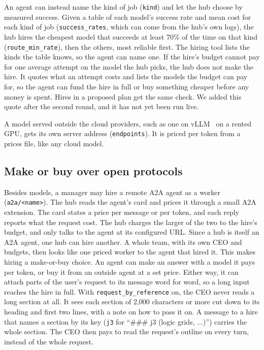 An agent can instead name the kind of job (\texttt{kind}) and let the hub choose by measured success. Given a table of
each model's success rate and mean cost for each kind of job (\texttt{success\_rates}, which can come from the hub's
own logs), the hub hires the cheapest model that succeeds at least 70\% of the time on that kind
(\texttt{route\_min\_rate}), then the others, most reliable first. The hiring tool lists the kinds the table knows, so
the agent can name one. If the hire's budget cannot pay for one average attempt on the model the hub picks, the hub does
not make the hire. It quotes what an attempt costs and lists the models the budget can pay for, so the agent can fund
the hire in full or buy something cheaper before any money is spent. Hires in a proposed plan get the same check. We
added this quote after the second round, and it has not yet been run live.

A model served outside the cloud providers, such as one on vLLM~\cite{kwon2023vllm} on a rented GPU, gets its own
server address (\texttt{endpoints}). It is priced per token from a prices file, like any cloud model.

\subsection{Make or buy over open protocols}
Besides models, a manager may hire a remote A2A agent as a worker (\texttt{a2a/<name>}). The hub reads the agent's
card and prices it through a small A2A extension. The card states a price per message or per token, and each reply
reports what the request cost. The hub charges the larger of the two to the hire's budget, and only talks to the agent
at its configured URL. Since a \sys{} hub is itself an A2A agent, one hub can hire another. A whole team, with its own
CEO and budgets, then looks like one priced worker to the agent that hired it. This makes hiring a make-or-buy choice.
An agent can make an answer with a model it pays per token, or buy it from an outside agent at a set price. Either way,
it can attach parts of the user's request to its message word for word, so a long input reaches the hire in full. With
\texttt{request\_by\_reference} on, the CEO never reads a long section at all. It sees each section of 2,000
characters or more cut down to its heading and first two lines, with a note on how to pass it on. A message to a hire
that names a section by its key (\texttt{j3} for ``\#\#\# j3 (logic grids, ...)'') carries the whole section. The CEO
then pays to read the request's outline on every turn, instead of the whole request.

